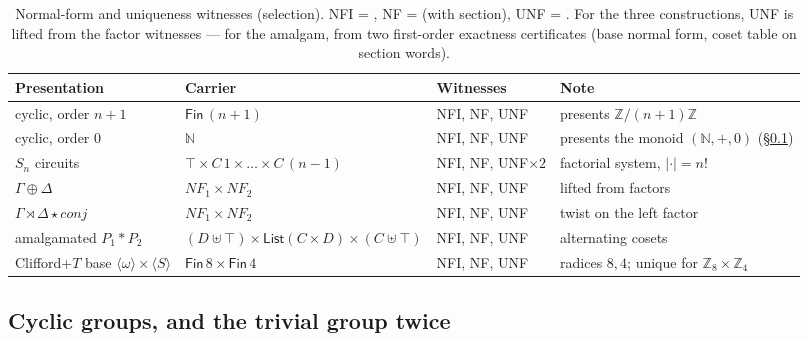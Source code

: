 \begin{table}
\caption{Normal-form and uniqueness witnesses (selection).  NFI =
, NF =  (with section), UNF =
.  For the three constructions, UNF is lifted
from the factor witnesses --- for the amalgam, from two first-order
exactness certificates (base normal form, coset table on section
words).}
\label{tab:nfs}
\centering
\small
\begin{tabular}{@{}llll@{}}
\toprule
Presentation & Carrier & Witnesses & Note \\
\midrule
cyclic, order $n{+}1$ & $\mathsf{Fin}\,(n{+}1)$ & NFI, NF, UNF & presents $\mathbb{Z}/(n{+}1)\mathbb{Z}$ \\
cyclic, order $0$ & $\mathbb{N}$ & NFI, NF, UNF & presents the monoid $(\mathbb{N}, +, 0)$ (\S\ref{sec:cyclic}) \\
$S_n$ circuits & $\top \times C\,1 \times \dots \times C\,(n{-}1)$ & NFI, NF, UNF$\times 2$ & factorial system, $|{\cdot}| = n!$ \\
$\Gamma \oplus \Delta$ & $\mathit{NF}_1 \times \mathit{NF}_2$ & NFI, NF, UNF & lifted from factors \\
$\Gamma \rtimes \Delta \star \mathit{conj}$ & $\mathit{NF}_1 \times \mathit{NF}_2$ & NFI, NF, UNF & twist on the left factor \\
amalgamated $P_1 \ast P_2$ & $(D \uplus \top) \times \mathsf{List}(C {\times} D) \times (C \uplus \top)$ & NFI, NF, UNF & alternating cosets \\
Clifford+$T$ base $\langle \omega \rangle {\times} \langle S \rangle$ & $\mathsf{Fin}\,8 \times \mathsf{Fin}\,4$ & NFI, NF, UNF & radices $8, 4$; unique for $\mathbb{Z}_8 {\times} \mathbb{Z}_4$ \\
\bottomrule
\end{tabular}
\end{table}

\subsection{Cyclic groups, and the trivial group twice}\label{sec:cyclic}

